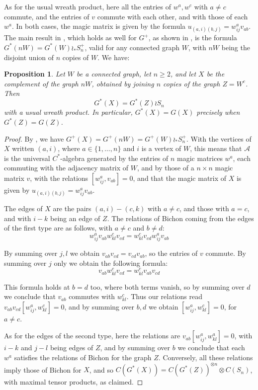 \documentclass[11pt]{amsart}
\newtheorem{proposition}[theorem]{Proposition}
\newcommand{\A}{\mathcal A}
\begin{document}
As for the usual wreath product, here all the entries of $w^a,w^c$ with $a\neq c$ commute, and the entries of $v$ commute with each other, and with those of each $w^a$. In both cases, the magic matrix is given by the formula $u_{(a,i)(b,j)}=w^a_{ij}v_{ab}$. The main result in \cite{bi2}, which holds as well for $G^+$, as shown in \cite{bbf}, is the formula $G^*(nW)=G^*(W)\wr_*S_n^+$, valid for any connected graph $W$, with $nW$ being the disjoint union of $n$ copies of $W$. We have:

\begin{proposition}
Let $W$ be a connected graph, let $n\geq2$, and let $X$ be the complement of the graph $nW$, obtained by joining $n$ copies of the graph $Z=W^c$. Then
$$G^*(X)=G^*(Z)\wr S_n$$
with a usual wreath product. In particular, $G^*(X)=G(X)$ precisely when $G^*(Z)=G(Z)$.
\end{proposition}

\begin{proof}
By \cite{bbf}, \cite{bi2} we have $G^+(X)=G^+(nW)=G^+(W)\wr_*S_n^+$. With the vertices of $X$ written $(a,i)$, where $a\in\{1,\ldots,n\}$ and $i$ is a vertex of $W$, this means that $\A$ is the universal $C^*$-algebra generated by the entries of $n$ magic matrices $w^a$, each commuting with the adjacency matrix of $W$, and by those of a $n\times n$ magic matrix $v$, with the relations $[w^a_{ij},v_{ab}]=0$, and that the magic matrix of $X$ is given by $u_{(a,i)(b,j)}=w^a_{ij}v_{ab}$.

The edges of $X$ are the pairs $(a,i)-(c,k)$ with $a\neq c$, and those with $a=c$, and with $i-k$ being an edge of $Z$. The relations of Bichon coming from the edges of the first type are as follows, with $a\neq c$ and $b\neq d$:
$$w^a_{ij}v_{ab}w^c_{kl}v_{cd}=w^c_{kl}v_{cd}w^a_{ij}v_{ab}$$

By summing over $j,l$ we obtain $v_{ab}v_{cd}=v_{cd}v_{ab}$, so the entries of $v$ commute. By summing over $j$ only we obtain the following formula:
$$v_{ab}w^c_{kl}v_{cd}=w^c_{kl}v_{ab}v_{cd}$$

This formula holds at $b=d$ too, where both terms vanish, so by summing over $d$ we conclude that $v_{ab}$ commutes with $w^c_{kl}$. Thus our relations read $v_{ab}v_{cd}[w^a_{ij},w^c_{kl}]=0$, and by summing over $b,d$ we obtain $[w^a_{ij},w^c_{kl}]=0$, for $a\neq c$.

As for the edges of the second type, here the relations are $v_{ab}[w^a_{ij},w^a_{kl}]=0$, with $i-k$ and $j-l$ being edges of $Z$, and by summing over $b$ we conclude that each $w^a$ satisfies the relations of Bichon for the graph $Z$. Conversely, all these relations imply those of Bichon for $X$, and so $C(G^*(X))=C(G^*(Z))^{\otimes n}\otimes C(S_n)$, with maximal tensor products, as claimed.
\end{proof}
\end{document}

